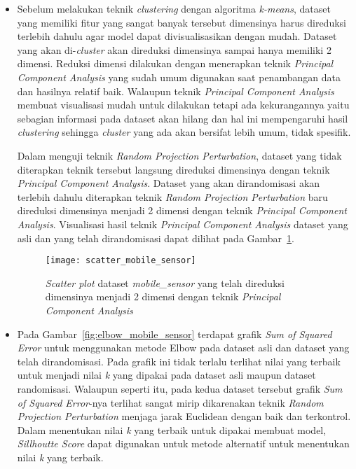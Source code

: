 \begin{itemize}
	\item Sebelum melakukan teknik \textit{clustering} dengan algoritma \textit{k-means}, dataset yang memiliki fitur yang sangat banyak tersebut dimensinya harus direduksi terlebih dahulu agar model dapat divisualisasikan dengan mudah. Dataset yang akan di-\textit{cluster} akan direduksi dimensinya sampai hanya memiliki 2 dimensi. Reduksi dimensi dilakukan dengan menerapkan teknik \textit{Principal Component Analysis} yang sudah umum digunakan saat penambangan data dan hasilnya relatif baik. Walaupun teknik \textit{Principal Component Analysis} membuat visualisasi mudah untuk dilakukan tetapi ada kekurangannya yaitu sebagian informasi pada dataset akan hilang dan hal ini mempengaruhi hasil \textit{clustering} sehingga \textit{cluster} yang ada akan bersifat lebih umum, tidak spesifik. 
	
	Dalam menguji teknik \textit{Random Projection Perturbation}, dataset yang tidak diterapkan teknik tersebut langsung direduksi dimensinya dengan teknik \textit{Principal Component Analysis}. Dataset yang akan dirandomisasi akan terlebih dahulu diterapkan teknik \textit{Random Projection Perturbation} baru direduksi dimensinya menjadi 2 dimensi dengan teknik \textit{Principal Component Analysis}. Visualisasi hasil teknik \textit{Principal Component Analysis} dataset yang asli dan yang telah dirandomisasi dapat dilihat pada Gambar~\ref{fig:scatter_mobile_sensor}.

	\begin{figure}
		\centering
		\texttt{[image: scatter\_mobile\_sensor]}
		\caption{\textit{Scatter plot} dataset \textit{mobile\_sensor} yang telah direduksi dimensinya menjadi 2 dimensi dengan teknik \textit{Principal Component Analysis}}
		\label{fig:scatter_mobile_sensor}
	\end{figure}
	\item Pada Gambar~\ref{fig:elbow_mobile_sensor} terdapat grafik \textit{Sum of Squared Error} untuk menggunakan metode Elbow pada dataset asli dan dataset yang telah dirandomisasi. Pada grafik ini tidak terlalu terlihat nilai yang terbaik untuk menjadi nilai \textit{k} yang dipakai pada dataset asli maupun dataset randomisasi. Walaupun seperti itu, pada kedua dataset tersebut grafik \textit{Sum of Squared Error}-nya terlihat sangat mirip dikarenakan teknik \textit{Random Projection Perturbation} menjaga jarak Euclidean dengan baik dan terkontrol. Dalam menentukan nilai \textit{k} yang terbaik untuk dipakai membuat model, \textit{Sillhoutte Score} dapat digunakan untuk metode alternatif untuk menentukan nilai \textit{k} yang terbaik.


\end{itemize}
